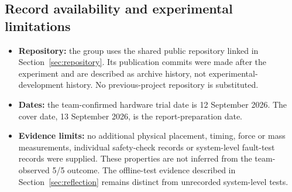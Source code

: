 \documentclass[11pt,a4paper]{article}
\begin{document}
\subsection{Record availability and experimental limitations}
\begin{itemize}
\item \textbf{Repository:} the group uses the shared public repository linked
in Section~\ref{sec:repository}. Its publication commits were made after the
experiment and are described as archive history, not experimental-development
history. No previous-project repository is substituted.
\item \textbf{Dates:} the team-confirmed hardware trial date is 12 September 2026.
The cover date, 13 September 2026, is the report-preparation date.
\item \textbf{Evidence limits:} no additional physical placement, timing, force
or mass measurements, individual safety-check records or system-level fault-test
records were supplied. These properties are not inferred from the team-observed
5/5 outcome. The offline-test evidence described in Section~\ref{sec:reflection}
remains distinct from unrecorded system-level tests.
\end{itemize}
\end{document}
